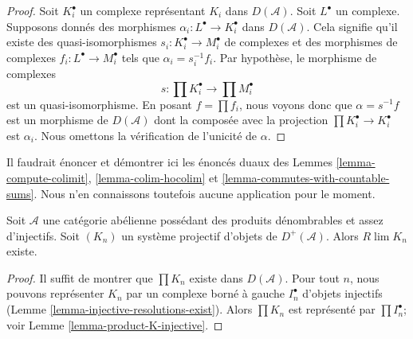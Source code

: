 \begin{proof}
Soit $K_i^\bullet$ un complexe représentant $K_i$ dans $D(\mathcal{A})$.
Soit $L^\bullet$ un complexe. Supposons donnés des morphismes
$\alpha_i : L^\bullet \to K_i^\bullet$ dans $D(\mathcal{A})$.
Cela signifie qu'il existe des quasi-isomorphismes
$s_i : K_i^\bullet \to M_i^\bullet$ de complexes et des morphismes de
complexes $f_i : L^\bullet \to M_i^\bullet$ tels que
$\alpha_i = s_i^{-1}f_i$. Par hypothèse, le morphisme de complexes
$$
s : \prod K_i^\bullet \longrightarrow \prod M_i^\bullet
$$
est un quasi-isomorphisme. En posant $f = \prod f_i$, nous voyons donc que
$\alpha = s^{-1}f$ est un morphisme de $D(\mathcal{A})$ dont la composée avec
la projection $\prod K_i^\bullet \to K_i^\bullet$ est $\alpha_i$.
Nous omettons la vérification de l'unicité de $\alpha$.
\end{proof}

\noindent
Il faudrait énoncer et démontrer ici les énoncés duaux des Lemmes
\ref{lemma-compute-colimit}, \ref{lemma-colim-hocolim} et
\ref{lemma-commutes-with-countable-sums}. Nous n'en connaissons toutefois
aucune application pour le moment.

\begin{lemma}
\label{lemma-inverse-limit-bounded-below}
Soit $\mathcal{A}$ une catégorie abélienne possédant des produits dénombrables
et assez d'injectifs. Soit $(K_n)$ un système projectif d'objets de
$D^+(\mathcal{A})$. Alors $R\lim K_n$ existe.
\end{lemma}

\begin{proof}
Il suffit de montrer que $\prod K_n$ existe dans $D(\mathcal{A})$.
Pour tout $n$, nous pouvons représenter $K_n$ par un complexe borné à gauche
$I_n^\bullet$ d'objets injectifs
(Lemme \ref{lemma-injective-resolutions-exist}).
Alors $\prod K_n$ est représenté par $\prod I_n^\bullet$; voir
Lemme \ref{lemma-product-K-injective}.
\end{proof}

